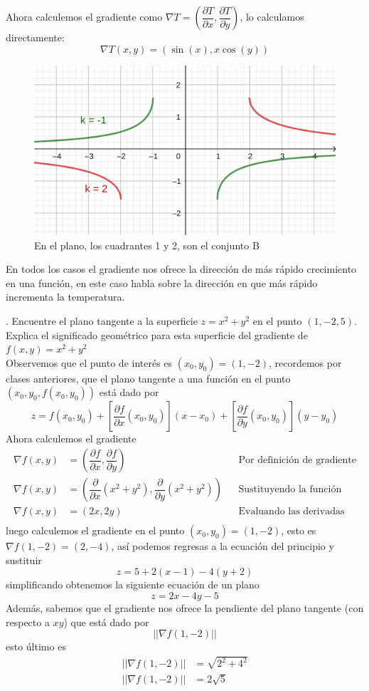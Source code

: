 \documentclass[letterpaper]{article}
\renewcommand{\d}{\partial}
\providecommand{\norm}[1]{\left|\left|#1\right|\right|}
\renewcommand{\*}{\cdot}
\theoremstyle{definition}
\begin{document}
Ahora calculemos el gradiente como $ \nabla T = \left(\dfrac{\d T}{\d x}, \dfrac{\d T}{\d y}\right) $, lo calculamos directamente:
\[ \nabla T(x,y) = (\sin(x), x\cos(y)) \]


\begin{figure}[h]
	\centering
	\includegraphics[height=0.3\textwidth]{img/ej2}
	\caption{En el plano, los cuadrantes 1 y 2, son el conjunto B}
\end{figure}

En todos los casos el gradiente nos ofrece la dirección de más rápido crecimiento en una función, en este caso habla sobre la dirección en que más rápido incrementa la temperatura.

. Encuentre el plano tangente a la superficie $ z = x^2 + y^2 $ en el punto $ (1,-2,5) $. Explica el significado geométrico para esta superficie del gradiente de $ f(x,y)= x^2 + y^2 $\\

Observemos que el punto de interés es $ (x_0, y_0) = (1,-2) $, recordemos por clases anteriores, que el plano tangente a una función en el punto $ (x_0, y_0, f(x_0,y_0)) $ está dado por
\[ z = f(x_0, y_0) + \left[ \dfrac{\d f}{\d x}(x_0,y_0) \right] (x - x_0) + \left[ \dfrac{\d f}{\d y}(x_0, y_0)\right](y - y_0) \]
Ahora calculemos el gradiente
\begin{align*}
	\nabla f(x,y) &= \left( \dfrac{\d f}{\d x},\dfrac{\d f}{\d y} \right) && \text{Por definición de gradiente}\\
	\nabla f(x,y) &= \left( \dfrac{\d }{\d x} (x^2 + y^2),\dfrac{\d}{\d y} (x^2 + y^2) \right) && \text{Sustituyendo la función }\\
	\nabla f(x,y) &= \left( 2x, 2y \right) && \text{Evaluando las derivadas}\\
\end{align*}
luego calculemos el gradiente en el punto $(x_0, y_0) = (1,-2) $, esto es $ \nabla f(1,-2) = (2,-4) $, así podemos regresas a la ecuación del principio y sustituir
\[ z = 5+ 2(x - 1) - 4(y+2) \]
simplificando obtenemos la siguiente ecuación de un plano
\[ z = 2x -4y -5 \]
Además, sabemos que el gradiente nos ofrece la pendiente del plano tangente (con respecto a $ xy $) que está dado por $$ \norm{\nabla f(1,-2)} $$esto último es 
\begin{align*}
	\norm{\nabla f(1,-2)} &= \sqrt{2^2 + 4^2}\\
	\norm{\nabla f(1,-2)} &= 2\sqrt{5}
\end{align*}
\end{document}
